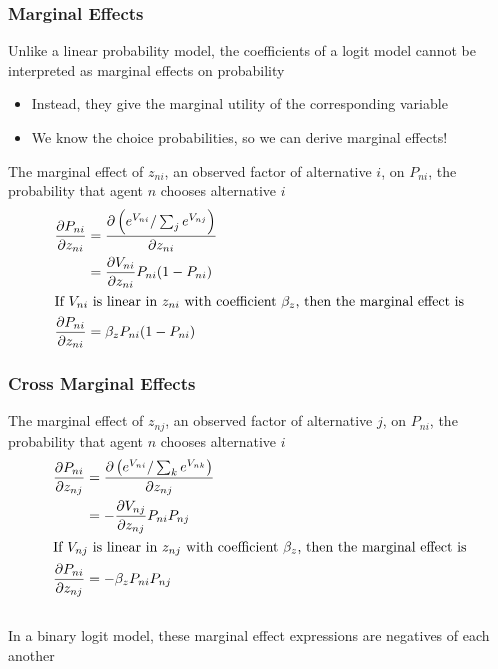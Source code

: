 \documentclass{beamer}
\begin{document}
\begin{frame}\frametitle{Marginal Effects}
    Unlike a linear probability model, the coefficients of a logit model cannot be interpreted as marginal effects on probability
    \begin{itemize}
    	\item Instead, they give the marginal utility of the corresponding variable
    	\item We know the choice probabilities, so we can derive marginal effects!
    \end{itemize}
    \vspace{2ex}
    The marginal effect of $z_{ni}$, an observed factor of alternative $i$, on $P_{ni}$, the probability that agent $n$ chooses alternative $i$
    \begin{align*}
    	\frac{\partial P_{ni}}{\partial z_{ni}} &= \frac{\partial \left( e^{V_{ni}} / \sum_j e^{V_{nj}} \right)}{\partial z_{ni}} \\
    	&= \frac{\partial V_{ni}}{\partial z_{ni}} P_{ni} (1 - P_{ni}) \\
    	\intertext{If $V_{ni}$ is linear in $z_{ni}$ with coefficient $\beta_z$, then the marginal effect is}
    	\frac{\partial P_{ni}}{\partial z_{ni}} &= \beta_z P_{ni} (1 - P_{ni})
    \end{align*}
\end{frame}

\begin{frame}\frametitle{Cross Marginal Effects}
    The marginal effect of $z_{nj}$, an observed factor of alternative $j$, on $P_{ni}$, the probability that agent $n$ chooses alternative $i$
    \begin{align*}
    	\frac{\partial P_{ni}}{\partial z_{nj}} &= \frac{\partial \left( e^{V_{ni}} / \sum_k e^{V_{nk}} \right)}{\partial z_{nj}} \\
    	&= -\frac{\partial V_{nj}}{\partial z_{nj}} P_{ni} P_{nj} \\
    	\intertext{If $V_{nj}$ is linear in $z_{nj}$ with coefficient $\beta_z$, then the marginal effect is}
    	\frac{\partial P_{ni}}{\partial z_{nj}} &= -\beta_z P_{ni} P_{nj}
    \end{align*} \\
    \vspace{1ex}
    In a binary logit model, these marginal effect expressions are negatives of each another
\end{frame}
\end{document}
